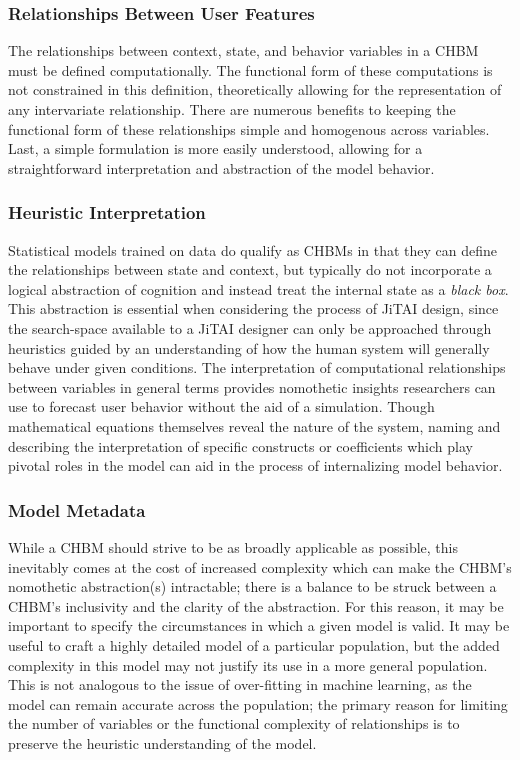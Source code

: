 \documentclass[runningheads,a4paper]{llncs}
\begin{document}
\subsubsection{Relationships Between User Features}
The relationships between context, state, and behavior variables in a CHBM must be defined computationally.
The functional form of these computations is not constrained in this definition, theoretically allowing for the representation of any intervariate relationship.
There are numerous benefits to keeping the functional form of these relationships simple and homogenous across variables.
Last, a simple formulation is more easily understood, allowing for a straightforward interpretation and abstraction of the model behavior.

\subsubsection{Heuristic Interpretation}
Statistical models trained on data do qualify as CHBMs in that they can define the relationships between state and context, but typically do not incorporate a logical abstraction of cognition and instead treat the internal state as a \emph{black box}.
This abstraction is essential when considering the process of JiTAI design, since the search-space available to a JiTAI designer can only be approached through heuristics guided by an understanding of how the human system will generally behave under given conditions.
The interpretation of computational relationships between variables in general terms provides nomothetic insights researchers can use to forecast user behavior without the aid of a simulation.
Though mathematical equations themselves reveal the nature of the system, naming and describing the interpretation of specific constructs or coefficients which play pivotal roles in the model can aid in the process of internalizing model behavior.
\subsubsection{Model Metadata}
While a CHBM should strive to be as broadly applicable as possible, this inevitably comes at the cost of increased complexity which can make the CHBM's nomothetic abstraction(s) intractable; there is a balance to be struck between a CHBM's inclusivity and the clarity of the abstraction.
For this reason, it may be important to specify the circumstances in which a given model is valid.
It may be useful to craft a highly detailed model of a particular population, but the added complexity in this model may not justify its use in a more general population.
This is not analogous to the issue of over-fitting in machine learning, as the model can remain accurate across the population; the primary reason for limiting the number of variables or the functional complexity of relationships is to preserve the heuristic understanding of the model.
\end{document}
